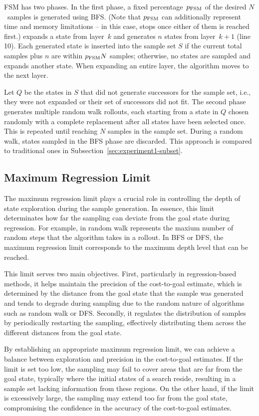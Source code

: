 FSM has two phases. In the first phase, a fixed percentage~$p_\text{FSM}$ of the desired $N$~samples is generated using BFS. (Note that $p_\text{FSM}$ can additionally represent time and memory limitations -- in this case, \bfs stops once either of them is reached first.) \bfs expands a state from layer~$k$ and generates $n$ states from layer~$k+1$ (line 10). Each generated state is inserted into the sample set $S$ if the current total samples plus $n$ are within $p_{\text{FSM}}N$ samples; otherwise, no states are sampled and \bfs expands another state. When expanding an entire layer, the algorithm moves to the next layer.

Let $Q$ be the states in $S$ that did not generate successors for the sample set, i.e., they were not expanded or their set of successors did not fit. The second phase generates multiple random walk rollouts, each starting from a state in $Q$ chosen randomly with a complete replacement after all states have been selected once. This is repeated until reaching $N$ samples in the sample set. During a random walk, states sampled in the BFS phase are discarded. This approach is compared to traditional ones in Subsection~\ref{sec:experiment1-subset}.

\subsection{Maximum Regression Limit}
\label{sec:rollout-depth-limit}

The maximum regression limit plays a crucial role in controlling the depth of state exploration during the sample generation. In essence, this limit determinates how far the sampling can deviate from the goal state during regression. For example, in random walk represents the maxium number of random steps that the algorithm takes in a rollout. In BFS or DFS, the maximum regression limit corresponds to the maximum depth level that can be reached.

This limit serves two main objectives. First, particularly in regression-based methods, it helps maintain the precision of the cost-to-goal estimate, which is determined by the distance from the goal state that the sample was generated and tends to degrade during sampling due to the random nature of algorithms such as random walk or DFS. Secondly, it regulates the distribution of samples by periodically restarting the sampling, effectively distributing them across the different distances from the goal state.

By establishing an appropriate maximum regression limit, we can achieve a balance between exploration and precision in the cost-to-goal estimates. If the limit is set too low, the sampling may fail to cover areas that are far from the goal state, typically where the initial states of a search reside, resulting in a sample set lacking information from these regions. On the other hand, if the limit is excessively large, the sampling may extend too far from the goal state, compromising the confidence in the accuracy of the cost-to-goal estimates.

